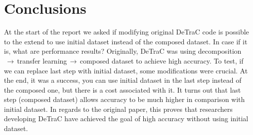 \section{Conclusions} %
At the start of the report we asked if modifying original DeTraC code is possible to the extend to use initial dataset instead of the composed dataset. In case if it is, what are performance results?
\newline
Originally, DeTraC was using decomposition$\,\to\,$transfer learning$\,\to\,$composed dataset to achieve high accuracy. To test, if we can replace last step with initial dataset, some modifications were crucial. At the end, it was a success, you can use initial dataset in the last step instead of the composed one, but there is a cost associated with it. It turns out that last step (composed dataset) allows accuracy to be much higher in comparison with initial dataset.
\newline
In regards to the original paper, this proves that researchers developing DeTraC have achieved the goal of high accuracy without using initial dataset. 

\newpage